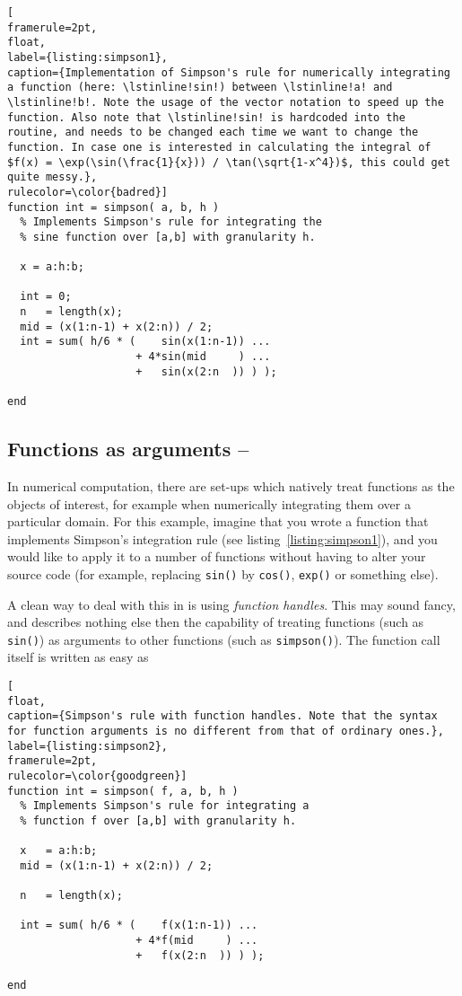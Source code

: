 \begin{lstlisting}[
framerule=2pt,
float,
label={listing:simpson1},
caption={Implementation of Simpson's rule for numerically integrating a function (here: \lstinline!sin!) between \lstinline!a! and \lstinline!b!. Note the usage of the vector notation to speed up the function. Also note that \lstinline!sin! is hardcoded into the routine, and needs to be changed each time we want to change the function. In case one is interested in calculating the integral of $f(x) = \exp(\sin(\frac{1}{x})) / \tan(\sqrt{1-x^4})$, this could get quite messy.},
rulecolor=\color{badred}]
function int = simpson( a, b, h )
  % Implements Simpson's rule for integrating the
  % sine function over [a,b] with granularity h.

  x = a:h:b;

  int = 0;
  n   = length(x);
  mid = (x(1:n-1) + x(2:n)) / 2;
  int = sum( h/6 * (    sin(x(1:n-1)) ...
                    + 4*sin(mid     ) ...
                    +   sin(x(2:n  )) ) );

end
\end{lstlisting}

\subsection{Functions as arguments -- \cleansymbol\cleansymbol\cleansymbol}

In numerical computation, there are set-ups which natively treat functions as
the objects of interest, for example when numerically integrating them over a
particular domain. For this example, imagine that you wrote a function that
implements Simpson's integration rule (see listing~\ref{listing:simpson1}),
and you would like to apply it to a number of functions without having to
alter your source code (for example, replacing \lstinline!sin()! by
\lstinline!cos()!, \lstinline!exp()! or something else).

A clean way to deal with this in \matlab{} is using \emph{function handles}. This may sound fancy, and describes nothing else then the capability of treating functions (such as \lstinline!sin()!) as arguments to other functions (such as \lstinline!simpson()!). The function call itself is written as easy as

\begin{lstlisting}[
float,
caption={Simpson's rule with function handles. Note that the syntax for function arguments is no different from that of ordinary ones.},
label={listing:simpson2},
framerule=2pt,
rulecolor=\color{goodgreen}]
function int = simpson( f, a, b, h )
  % Implements Simpson's rule for integrating a
  % function f over [a,b] with granularity h.

  x   = a:h:b;
  mid = (x(1:n-1) + x(2:n)) / 2;

  n   = length(x);

  int = sum( h/6 * (    f(x(1:n-1)) ...
                    + 4*f(mid     ) ...
                    +   f(x(2:n  )) ) );

end
\end{lstlisting}

